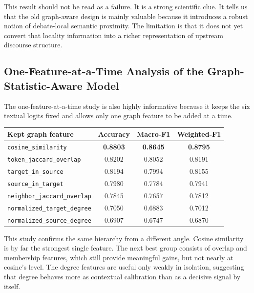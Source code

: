 \documentclass[11pt,a4paper]{article}
\begin{document}
This result should not be read as a failure. It is a strong scientific clue. It tells us that the old graph-aware
design is mainly valuable because it introduces a robust notion of debate-local semantic proximity. The limitation is
that it does not yet convert that locality information into a richer representation of upstream discourse structure.

\subsection{One-Feature-at-a-Time Analysis of the Graph-Statistic-Aware Model}
The one-feature-at-a-time study is also highly informative because it keeps the six textual logits fixed and allows
only one graph feature to be added at a time.

\begin{center}
\begin{tabular}{lccc}
\toprule
Kept graph feature & Accuracy & Macro-F1 & Weighted-F1 \\
\midrule
\texttt{cosine\_similarity} & \textbf{0.8803} & \textbf{0.8645} & \textbf{0.8795} \\
\texttt{token\_jaccard\_overlap} & 0.8202 & 0.8052 & 0.8191 \\
\texttt{target\_in\_source} & 0.8194 & 0.7994 & 0.8155 \\
\texttt{source\_in\_target} & 0.7980 & 0.7784 & 0.7941 \\
\texttt{neighbor\_jaccard\_overlap} & 0.7845 & 0.7657 & 0.7812 \\
\texttt{normalized\_target\_degree} & 0.7050 & 0.6883 & 0.7012 \\
\texttt{normalized\_source\_degree} & 0.6907 & 0.6747 & 0.6870 \\
\bottomrule
\end{tabular}
\end{center}

This study confirms the same hierarchy from a different angle. Cosine similarity is by far the strongest single
feature. The next best group consists of overlap and membership features, which still provide meaningful gains, but not
nearly at cosine's level. The degree features are useful only weakly in isolation, suggesting that degree behaves more
as contextual calibration than as a decisive signal by itself.
\end{document}

